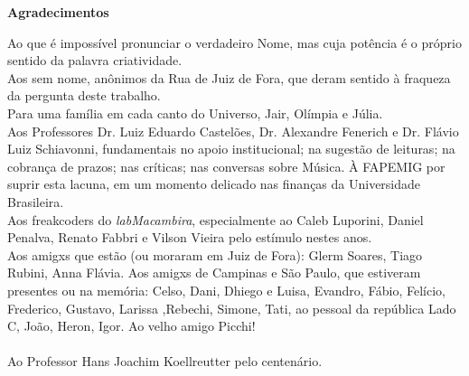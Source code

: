 \newpage
\begin{flushright}
\huge{\textbf{Agradecimentos}}

\small{Ao que é impossível pronunciar o verdadeiro Nome, mas cuja potência é o próprio sentido da palavra criatividade.
\ \\
Aos sem nome, anônimos da Rua de Juiz de Fora, que deram sentido à fraqueza da pergunta deste trabalho.
\ \\
Para uma família em cada canto do Universo, Jair, Olímpia e Júlia. 
\ \\
Aos Professores Dr. Luiz Eduardo Castelões, Dr. Alexandre Fenerich e Dr. Flávio Luiz Schiavonni, fundamentais no apoio institucional; na sugestão de leituras; na cobrança de prazos; nas críticas; nas conversas sobre Música. À FAPEMIG por suprir esta lacuna, em um momento delicado nas finanças da Universidade Brasileira.
\ \\
Aos freakcoders do \emph{labMacambira}, especialmente ao Caleb Luporini, Daniel Penalva, Renato Fabbri e Vilson Vieira pelo estímulo nestes anos. 
\ \\
Aos amigxs que estão (ou moraram em Juiz de Fora): Glerm Soares, Tiago Rubini, Anna Flávia. Aos amigxs de Campinas e São Paulo, que estiveram presentes ou na memória: Celso, Dani, Dhiego e Luisa, Evandro, Fábio, Felício, Frederico, Gustavo, Larissa ,Rebechi, Simone, Tati,  ao pessoal da república Lado C, João, Heron, Igor. Ao velho amigo Picchi!
\ \\
\ \\
Ao Professor Hans Joachim Koellreutter pelo centenário.}
\end{flushright}

\vfil \ 

\newpage